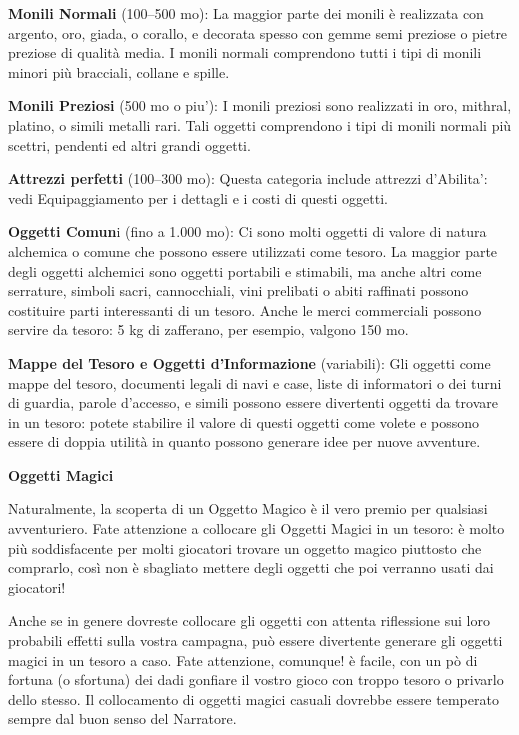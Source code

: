 \documentclass[a4paper,11pt,twoside,openany]{book}
\begin{document}
\textbf{Monili Normali} (100--500 mo): La maggior parte dei monili è realizzata con argento, oro, giada, o corallo, e decorata spesso con gemme semi preziose o pietre preziose di qualità media. I monili normali comprendono tutti i tipi di monili minori più bracciali, collane e spille.

\textbf{Monili Preziosi} (500 mo o piu'): I monili preziosi sono realizzati in oro, mithral, platino, o simili metalli rari. Tali oggetti comprendono i tipi di monili normali più scettri, pendenti ed altri grandi oggetti.

\textbf{Attrezzi perfetti} (100--300 mo): Questa categoria include attrezzi d'Abilita': vedi Equipaggiamento per i dettagli e i costi di questi oggetti.

\textbf{Oggetti Comun}i (fino a 1.000 mo): Ci sono molti oggetti di valore di natura alchemica o comune che possono essere utilizzati come tesoro. La maggior parte degli oggetti alchemici sono oggetti portabili e stimabili, ma anche altri come serrature, simboli sacri, cannocchiali, vini prelibati o abiti raffinati possono costituire parti interessanti di un tesoro. Anche le merci commerciali possono servire da tesoro: 5 kg di zafferano, per esempio, valgono 150 mo.

\textbf{Mappe del Tesoro e Oggetti d'Informazione} (variabili): Gli oggetti come mappe del tesoro, documenti legali di navi e case, liste di informatori o dei turni di guardia, parole d'accesso, e simili possono essere divertenti oggetti da trovare in un tesoro: potete stabilire il valore di questi oggetti come volete e possono essere di doppia utilità in quanto possono generare idee per nuove avventure.

\textbf{Oggetti Magici}

Naturalmente, la scoperta di un Oggetto Magico è il vero premio per qualsiasi avventuriero. Fate attenzione a collocare gli Oggetti Magici in un tesoro: è molto più soddisfacente per molti giocatori trovare un oggetto magico piuttosto che comprarlo, così non è sbagliato mettere degli oggetti che poi verranno usati dai giocatori!

Anche se in genere dovreste collocare gli oggetti con attenta riflessione sui loro probabili effetti sulla vostra campagna, può essere divertente generare gli oggetti magici in un tesoro a caso. Fate attenzione, comunque! è facile, con un pò di fortuna (o sfortuna) dei dadi gonfiare il vostro gioco con troppo tesoro o privarlo dello stesso. Il collocamento di oggetti magici casuali dovrebbe essere temperato sempre dal buon senso del Narratore.
\end{document}
